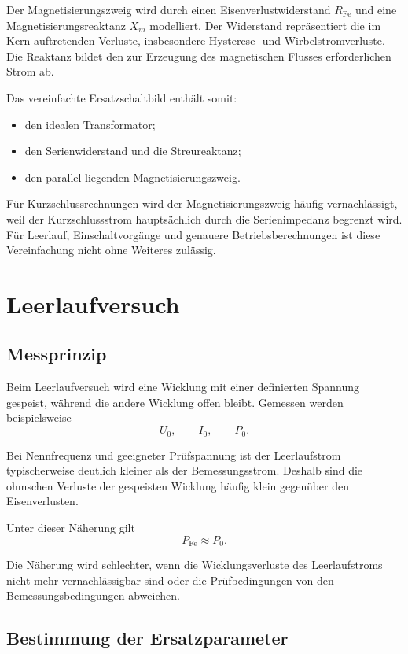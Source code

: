 Der Magnetisierungszweig wird durch einen Eisenverlustwiderstand
\(R_{\mathrm{Fe}}\) und eine Magnetisierungsreaktanz \(X_m\) modelliert.
Der Widerstand repräsentiert die im Kern auftretenden Verluste,
insbesondere Hysterese- und Wirbelstromverluste. Die Reaktanz bildet
den zur Erzeugung des magnetischen Flusses erforderlichen Strom ab.

Das vereinfachte Ersatzschaltbild enthält somit:
\begin{itemize}
  \item den idealen Transformator;
  \item den Serienwiderstand und die Streureaktanz;
  \item den parallel liegenden Magnetisierungszweig.
\end{itemize}

Für Kurzschlussrechnungen wird der Magnetisierungszweig häufig vernachlässigt,
weil der Kurzschlussstrom hauptsächlich durch die Serienimpedanz begrenzt wird.
Für Leerlauf, Einschaltvorgänge und genauere Betriebsberechnungen ist diese
Vereinfachung nicht ohne Weiteres zulässig.

\section{Leerlaufversuch}

\subsection{Messprinzip}

Beim Leerlaufversuch wird eine Wicklung mit einer definierten Spannung gespeist,
während die andere Wicklung offen bleibt. Gemessen werden beispielsweise
\[
  U_0,\qquad I_0,\qquad P_0.
\]

Bei Nennfrequenz und geeigneter Prüfspannung ist der Leerlaufstrom typischerweise
deutlich kleiner als der Bemessungsstrom. Deshalb sind die ohmschen Verluste
der gespeisten Wicklung häufig klein gegenüber den Eisenverlusten.

Unter dieser Näherung gilt
\[
  P_{\mathrm{Fe}}\approx P_0.
\]

Die Näherung wird schlechter, wenn die Wicklungsverluste des Leerlaufstroms
nicht mehr vernachlässigbar sind oder die Prüfbedingungen von den
Bemessungsbedingungen abweichen.

\subsection{Bestimmung der Ersatzparameter}

